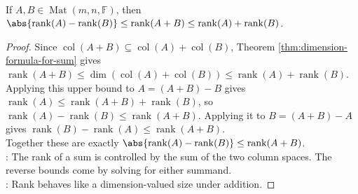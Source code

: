 \begin{theorem} \label{thm:rank-triangle-inequality} \\
If $A,B\in\operatorname{Mat}(m,n,\mathbb{F})$, then $\abs{\operatorname{rank}(A)-\operatorname{rank}(B)} \leq \operatorname{rank}(A+B) \leq \operatorname{rank}(A)+\operatorname{rank}(B)$.
\begin{proof}
Since $\operatorname{col}(A+B)\subseteq\operatorname{col}(A)+\operatorname{col}(B)$, Theorem \ref{thm:dimension-formula-for-sum} gives $\operatorname{rank}(A+B)\leq\dim(\operatorname{col}(A)+\operatorname{col}(B))\leq\operatorname{rank}(A)+\operatorname{rank}(B)$.
Applying this upper bound to $A=(A+B)-B$ gives $\operatorname{rank}(A)\leq\operatorname{rank}(A+B)+\operatorname{rank}(B)$, so $\operatorname{rank}(A)-\operatorname{rank}(B)\leq\operatorname{rank}(A+B)$. Applying it to $B=(A+B)-A$ gives $\operatorname{rank}(B)-\operatorname{rank}(A)\leq\operatorname{rank}(A+B)$.\\
Together these are exactly $\abs{\operatorname{rank}(A)-\operatorname{rank}(B)}\leq\operatorname{rank}(A+B)$.\\
: The rank of a sum is controlled by the sum of the two column spaces. The reverse bounds come by solving for either summand.\\
: Rank behaves like a dimension-valued size under addition.
\end{proof}
\end{theorem}

